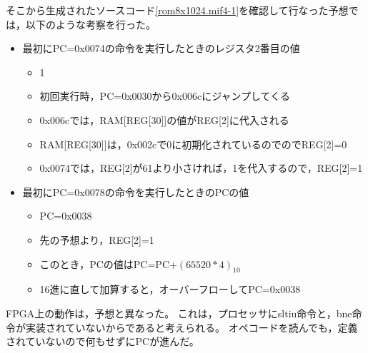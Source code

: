 そこから生成されたソースコード\ref{rom8x1024.mif4-1}を確認して行なった予想では，以下のような考察を行った。
\begin{itemize}
  \item 最初にPC=0x0074の命令を実行したときのレジスタ2番目の値
  \begin{itemize}
    \item 1
    \item 初回実行時，PC=0x0030から0x006cにジャンプしてくる
    \item 0x006cでは，RAM[REG[30]]の値がREG[2]に代入される
    \item RAM[REG[30]]は，0x002cで0に初期化されているのでのでREG[2]=0
    \item 0x0074では，REG[2]が61より小さければ，1を代入するので，REG[2]=1
  \end{itemize}
  \item 最初にPC=0x0078の命令を実行したときのPCの値
  \begin{itemize}
    \item PC=0x0038
    \item 先の予想より，REG[2]=1
    \item このとき，PCの値はPC=PC+$(65520*4)_{10}$
    \item 16進に直して加算すると，オーバーフローしてPC=0x0038
  \end{itemize}
\end{itemize}

FPGA上の動作は，予想と異なった。
これは，プロセッサにsltiu命令と，bne命令が実装されていないからであると考えられる。
オペコードを読んでも，定義されていないので何もせずにPCが進んだ。
